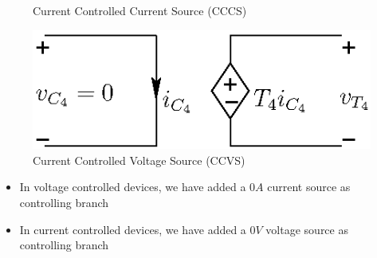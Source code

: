\documentclass{beamer}
\begin{document}
\begin{frame}
\begin{minipage}[!b]{0.47\linewidth}
\begin{figure}[!ht]
      \caption{\scriptsize Current Controlled Current Source (CCCS)}
      \label{cccs}
  \end{figure}
\end{minipage}
\begin{minipage}[!b]{0.47\linewidth}
  \begin{figure}[!ht]
     \centering
      \includegraphics[scale=0.6]{../figures/CCVS.eps}
      \caption{\scriptsize Current Controlled Voltage Source (CCVS) }
      \label{ccvs}
  \end{figure}
    \end{minipage}
\begin{scriptsize}
\begin{itemize}
\item In voltage controlled devices, we have added a $0A$ current source as controlling branch
\item In current controlled devices, we have added a $0V$ voltage source as controlling branch
\end{itemize}
\end{scriptsize}
\end{frame}
\end{document}
